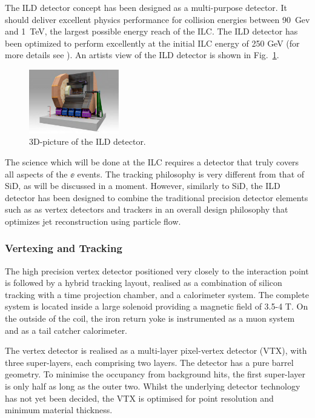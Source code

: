 The ILD detector concept has been designed as a multi-purpose detector. It should deliver excellent physics performance for collision energies between 90~Gev and 1~TeV, the largest possible energy reach of the ILC. The ILD detector has been optimized to perform excellently at the initial ILC energy of 250 GeV (for more details see \cite{ild:bib:ILDloi,ild:bib:ILDDBD}). An artists view of the ILD detector is shown in Fig.~\ref{fig:ild_3d}. 
\begin{figure}
    \centering
    \includegraphics[width=0.35\textwidth]{../figures/ILD.pdf}
    \caption{3D-picture of the ILD detector.}
    \label{fig:ild_3d}
\end{figure}

The science which will be done at the ILC requires a detector that
truly covers all aspects of the $\ee$ events.  The tracking philosophy
is very different from that of SiD, as will be discussed in a moment.
However, similarly to SiD, the ILD detector has been designed to combine the traditional
precision detector 
elements such as as vertex detectors and trackers in an overall design
philosophy 
that optimizes jet reconstruction using particle flow. 


\subsubsection{Vertexing and Tracking}
\label{subsubsec:ILDtracker}
The high precision vertex detector positioned very closely to the
interaction point is followed by a hybrid tracking layout, realised as
a combination of silicon tracking with a time projection chamber, and
a calorimeter system. The complete system is located inside a large
solenoid providing a magnetic field of 3.5-4 T. On the outside of the
coil, 
the iron return yoke is instrumented as a muon system and as a tail catcher calorimeter. 

The vertex detector is realised as a multi-layer pixel-vertex detector
(VTX), with three super-layers, each comprising two layers. The
detector
 has a pure barrel geometry. To minimise the occupancy from background hits,
the first super-layer is only half as long as the outer two. Whilst the underlying detector technology has not yet been decided, 
the VTX is optimised for point resolution and
 minimum material thickness. 
	
